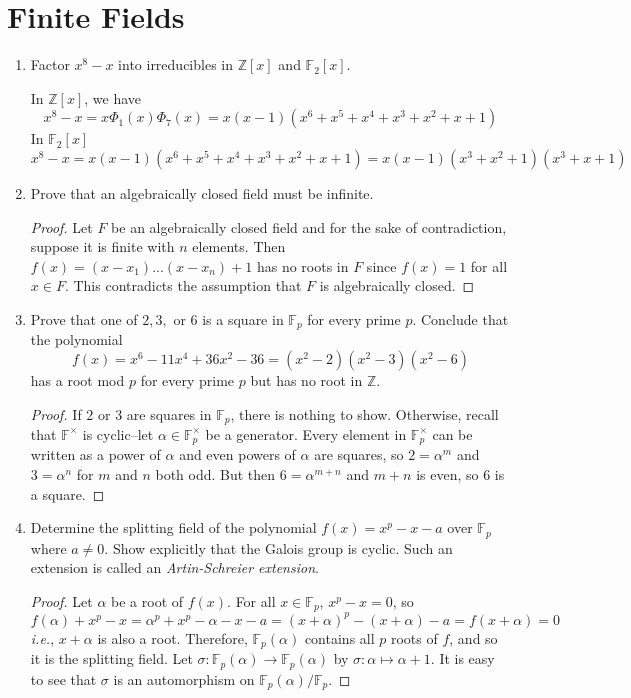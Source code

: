 \documentclass{report}
\newcommand{\Z}{\mathbb{Z}}
\newcommand{\F}{\mathbb{F}}
\begin{document}
\section{Finite Fields}
\begin{enumerate} 
	\item Factor $x^8-x$ into irreducibles in $\Z[x]$ and $\F_2[x]$.
		\newline

		In $\Z[x]$, we have
		$$x^8-x=x\Phi_1(x)\Phi_7(x) = x(x-1)(x^6+x^5+x^4+x^3+x^2+x+1)$$
		In $\F_2[x]$
		$$x^8-x=x(x-1)(x^6+x^5+x^4+x^3+x^2+x+1)=x(x-1)(x^3+x^2+1)(x^3+x+1)$$
		\setcounter{enumi}{2}
	\item Prove that an algebraically closed field must be infinite.
		\begin{proof}
			Let $F$ be an algebraically closed field and for the sake of contradiction, suppose it is finite with $n$ elements.
			Then $f(x)=(x-x_1)...(x-x_n)+1$ has no roots in $F$ since $f(x)=1$ for all $x\in F$. This contradicts the assumption that $F$ is algebraically closed.
		\end{proof}
		\setcounter{enumi}{6}
	\item Prove that one of $2,3,$ or $6$ is a square in $\F_p$ for every prime $p$. Conclude that the polynomial
		$$f(x)=x^6-11x^4+36x^2-36=(x^2-2)(x^2-3)(x^2-6)$$
		has a root mod $p$ for every prime $p$ but has no root in $\Z$.
		\begin{proof}
			If $2$ or $3$ are squares in $\F_p$, there is nothing to show. Otherwise, recall that $\F^\times$ is cyclic--let $\alpha\in\F^\times_p$ be a generator. 
			Every element in $\F_p^\times$ can be written as a power of $\alpha$ and even powers of $\alpha$ are squares, so $2=\alpha^m$ and $3=\alpha^n$
			for $m$ and $n$ both odd. But then $6=\alpha^{m+n}$ and $m+n$ is even, so $6$ is a square.
		\end{proof}
	\item Determine the splitting field of the polynomial $f(x)=x^p-x-a$ over $\F_p$ where $a\neq 0$. Show explicitly that the Galois group is cyclic.
		Such an extension is called an \textit{Artin-Schreier extension}.
		\begin{proof}
			Let $\alpha$ be a root of $f(x)$. For all $x\in\F_p$, $x^p-x=0$, so 
			$$f(\alpha)+x^p-x=\alpha^p+x^p-\alpha-x-a=(x+\alpha)^p-(x+\alpha)-a=f(x+\alpha)=0$$
			\textit{i.e.}, $x+\alpha$ is also a root. Therefore, $\F_p(\alpha)$ contains all $p$ roots of $f$, and so it is the splitting field.
			Let $\sigma:\F_p (\alpha)\to\F_p (\alpha)$ by $\sigma:\alpha\mapsto\alpha+1$. It is easy to see that $\sigma$ is an automorphism on $\F_p (\alpha) / \F_p$.

\end{proof}
\end{enumerate}
\end{document}
